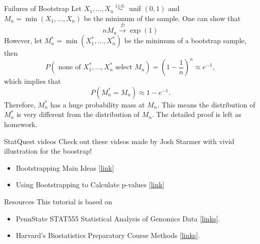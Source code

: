 \documentclass[
  ignorenonframetext,
]{beamer}
\begin{document}
\begin{frame}{Failures of Bootstrap}
\protect{}\label{failures-of-bootstrap}
Let \(X_1, \ldots, X_n \stackrel{\text { i.i.d. }}{\sim}\) unif
\((0,1)\) and \(M_n=\min \left(X_1, \ldots, X_n\right)\) be the minimum
of the sample. One can show that \[
n M_n \stackrel{\mathcal{D}}{\rightarrow} \exp (1)
\] However, let \(M_n^*=\min \left(X_1^*, \ldots, X_n^*\right)\) be the
minimum of a bootstrap sample, then \[
P\left(\text { none of } X_1^*, \ldots, X_n^* \text { select } M_n\right)=\left(1-\frac{1}{n}\right)^n \approx e^{-1},
\] which implies that \[
P\left(M_n^*=M_n\right) \approx 1-e^{-1} .
\] Therefore, \(M_n^*\) has a huge probability mass at \(M_n\). This
means the distribution of \(M_n^*\) is very different from the
distribution of \(M_n\). The detailed proof is left as homework.
\end{frame}

\begin{frame}{StatQuest videos}
\protect{}\label{statquest-videos}
Check out these videos made by Josh Starmer with vivid illustration for
the boostrap!

\begin{itemize}
\item
  Bootstrapping Main Ideas
  {[}\href{https://youtu.be/Xz0x-8-cgaQ}{link}{]}
\item
  Using Bootstrapping to Calculate p-values
  {[}\href{https://youtu.be/N4ZQQqyIf6k}{link}{]}
\end{itemize}
\end{frame}

\begin{frame}{Resources}
\protect{}\label{resources}
This tutorial is based on

\begin{itemize}
\item
  PennState STAT555 Statistical Analysis of Genomics Data
  {[}\href{https://online.stat.psu.edu/stat555/node/119/}{links}{]}.
\item
  Harvard's Biostatistics Preparatory Course Methods
  {[}\href{https://isabelfulcher.github.io/methodsprep/slides/Lecture_7/2018_Lecture_07.pdf}{links}{]}.
\end{itemize}
\end{frame}
\end{document}
